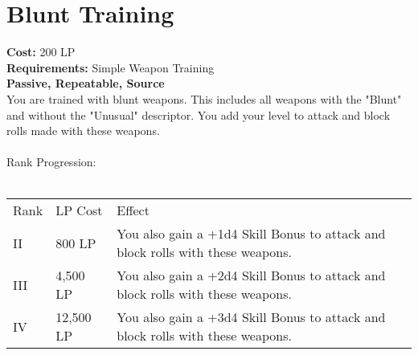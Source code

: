 \section{Blunt Training}\label{perk:bluntTraining}
\textbf{Cost:} 200 LP\\
\textbf{Requirements:} Simple Weapon Training\\
\textbf{Passive, Repeatable, Source}\\
You are trained with blunt weapons.
This includes all weapons with the "Blunt" and without the "Unusual" descriptor.
You add your level to attack and block rolls made with these weapons.\\
\\
Rank Progression:\\
\\
\begin{longtable}{l | l | p{9cm}}
	Rank & LP Cost & Effect\\
	II & 800 LP & You also gain a +1d4 Skill Bonus to attack and block rolls with these weapons.\\
	III & 4,500 LP & You also gain a +2d4 Skill Bonus to attack and block rolls with these weapons.\\
	IV & 12,500 LP & You also gain a +3d4 Skill Bonus to attack and block rolls with these weapons.\\
\end{longtable}